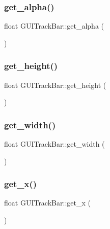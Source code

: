 \hypertarget{class_g_u_i_track_bar_aec43dc778aac26a143c8be8cee021420}{}\label{class_g_u_i_track_bar_aec43dc778aac26a143c8be8cee021420} 
\subsubsection{\texorpdfstring{get\+\_\+alpha()}{get\_alpha()}}
{\footnotesize\ttfamily float G\+U\+I\+Track\+Bar\+::get\+\_\+alpha (\begin{DoxyParamCaption}{ }\end{DoxyParamCaption})}

\hypertarget{class_g_u_i_track_bar_a26de8c2b9fcf49e595080c89df9d3591}{}\label{class_g_u_i_track_bar_a26de8c2b9fcf49e595080c89df9d3591} 
\subsubsection{\texorpdfstring{get\+\_\+height()}{get\_height()}}
{\footnotesize\ttfamily float G\+U\+I\+Track\+Bar\+::get\+\_\+height (\begin{DoxyParamCaption}{ }\end{DoxyParamCaption})}

\hypertarget{class_g_u_i_track_bar_a9dfaa0ee6a6bd5b504f2da2d96acf191}{}\label{class_g_u_i_track_bar_a9dfaa0ee6a6bd5b504f2da2d96acf191} 
\subsubsection{\texorpdfstring{get\+\_\+width()}{get\_width()}}
{\footnotesize\ttfamily float G\+U\+I\+Track\+Bar\+::get\+\_\+width (\begin{DoxyParamCaption}{ }\end{DoxyParamCaption})}

\hypertarget{class_g_u_i_track_bar_ad2d9c2cdc5ace20b8f5dee0663d270e4}{}\label{class_g_u_i_track_bar_ad2d9c2cdc5ace20b8f5dee0663d270e4} 
\subsubsection{\texorpdfstring{get\+\_\+x()}{get\_x()}}
{\footnotesize\ttfamily float G\+U\+I\+Track\+Bar\+::get\+\_\+x (\begin{DoxyParamCaption}{ }\end{DoxyParamCaption})}

